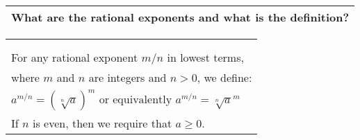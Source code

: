 \begin{small}
    \begin{tabularx}{1\textwidth}{
            p{}
        }
        \toprule
        What are the rational exponents and what is the definition?
        \\
        \bottomrule
    \end{tabularx}
\end{small}

\begin{small}
    \begin{tabularx}{1\textwidth}{
            p{}
        }
        \toprule
        \makecell{
            $ a^{\frac{1}{n}} = \sqrt[n]{a} $\\
            \\
            For any rational exponent $m/n$ in lowest terms,\\ 
            where $m$ and $n$ are integers and $n > 0$, we define: \\
            $ a^{m/n} = \left(\sqrt[n]a\right)^m \text{ or equivalently } a^{m/n} = \sqrt[n]a^m $\\
            If $n$ is even, then we require that $a \geq 0$.
        }
        \\
        \bottomrule
    \end{tabularx}
\end{small}

